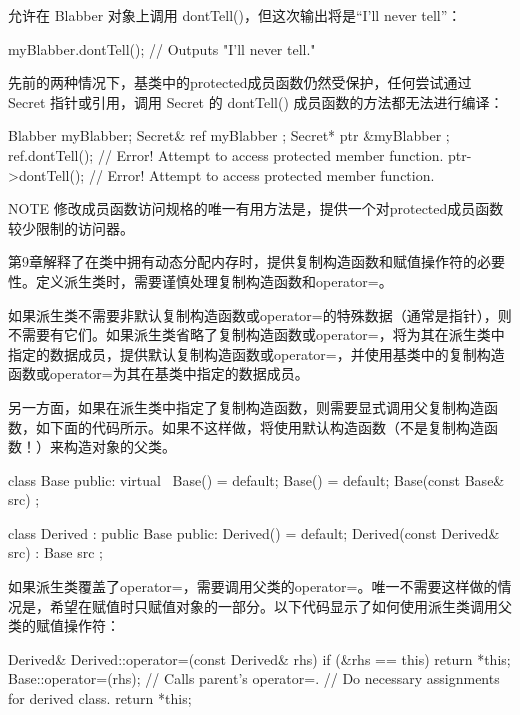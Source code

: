 允许在 Blabber 对象上调用 dontTell()，但这次输出将是“I’ll never tell”：

\begin{cpp}
myBlabber.dontTell(); // Outputs "I'll never tell."
\end{cpp}

先前的两种情况下，基类中的protected成员函数仍然受保护，任何尝试通过 Secret 指针或引用，调用 Secret 的 dontTell() 成员函数的方法都无法进行编译：

\begin{cpp}
Blabber myBlabber;
Secret& ref { myBlabber };
Secret* ptr { &myBlabber };
ref.dontTell(); // Error! Attempt to access protected member function.
ptr->dontTell(); // Error! Attempt to access protected member function.
\end{cpp}

\begin{myNotic}{NOTE}
修改成员函数访问规格的唯一有用方法是，提供一个对protected成员函数较少限制的访问器。
\end{myNotic}


第9章解释了在类中拥有动态分配内存时，提供复制构造函数和赋值操作符的必要性。定义派生类时，需要谨慎处理复制构造函数和operator=。

如果派生类不需要非默认复制构造函数或operator=的特殊数据（通常是指针），则不需要有它们。如果派生类省略了复制构造函数或operator=，将为其在派生类中指定的数据成员，提供默认复制构造函数或operator=，并使用基类中的复制构造函数或operator=为其在基类中指定的数据成员。

另一方面，如果在派生类中指定了复制构造函数，则需要显式调用父复制构造函数，如下面的代码所示。如果不这样做，将使用默认构造函数（不是复制构造函数！）来构造对象的父类。

\begin{cpp}
class Base
{
    public:
        virtual ~Base() = default;
        Base() = default;
        Base(const Base& src) { }
};

class Derived : public Base
{
    public:
        Derived() = default;
        Derived(const Derived& src) : Base { src } { }
};
\end{cpp}

如果派生类覆盖了operator=，需要调用父类的operator=。唯一不需要这样做的情况是，希望在赋值时只赋值对象的一部分。以下代码显示了如何使用派生类调用父类的赋值操作符：

\begin{cpp}
Derived& Derived::operator=(const Derived& rhs)
{
    if (&rhs == this) { return *this; }
    Base::operator=(rhs); // Calls parent's operator=.
    // Do necessary assignments for derived class.
    return *this;
}
\end{cpp}

